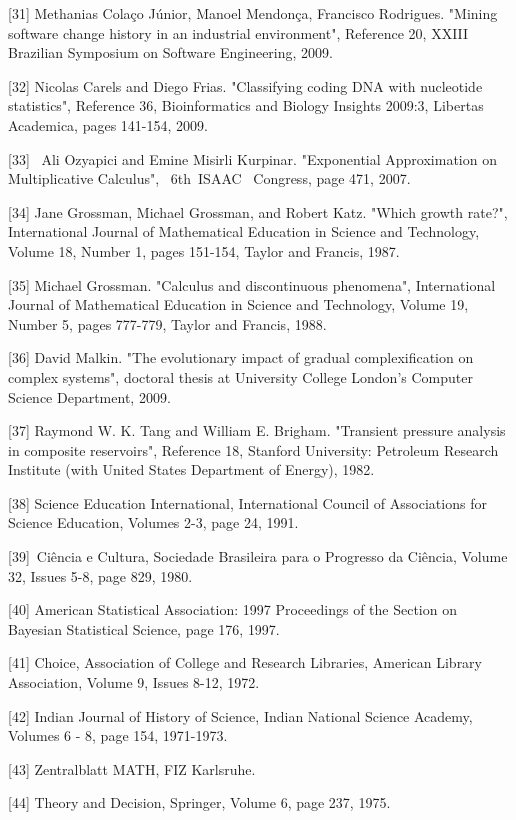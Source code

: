 \documentclass[12pt]{article}
\begin{document}
[31] Methanias Colaço Júnior, Manoel Mendonça, Francisco Rodrigues. "Mining software change history in an industrial environment", Reference 20, XXIII Brazilian Symposium on Software Engineering, 2009.

[32] Nicolas Carels and Diego Frias. "Classifying coding DNA with nucleotide statistics", Reference 36, Bioinformatics and Biology Insights 2009:3, Libertas Academica, pages 141-154, 2009.

[33]  Ali Ozyapici and Emine Misirli Kurpinar. "Exponential Approximation on Multiplicative Calculus",  6th ISAAC  Congress, page 471, 2007.

[34] Jane Grossman, Michael Grossman, and Robert Katz. "Which growth rate?", International Journal of Mathematical Education in Science and Technology, Volume 18, Number 1, pages 151-154, Taylor and Francis, 1987.

[35] Michael Grossman. "Calculus and discontinuous phenomena", International Journal of Mathematical Education in Science and Technology, Volume 19, Number 5, pages 777-779, Taylor and Francis, 1988.

[36] David Malkin. "The evolutionary impact of gradual complexification on complex systems", doctoral thesis at University College London's Computer Science Department, 2009.

[37] Raymond W. K. Tang and William E. Brigham. "Transient pressure analysis in composite reservoirs", Reference 18, Stanford University: Petroleum Research Institute (with United States Department of Energy), 1982.

[38] Science Education International, International Council of Associations for Science Education, Volumes 2-3, page 24, 1991.

[39] Ciência e Cultura, Sociedade Brasileira para o Progresso da Ciência, Volume 32, Issues 5-8, page 829, 1980.

[40] American Statistical Association: 1997 Proceedings of the Section on Bayesian Statistical Science, page 176, 1997.

[41] Choice, Association of College and Research Libraries, American Library Association, Volume 9, Issues 8-12, 1972.

[42] Indian Journal of History of Science, Indian National Science Academy, Volumes 6 - 8, page 154, 1971-1973.

[43] Zentralblatt MATH, FIZ Karlsruhe.

[44] Theory and Decision, Springer, Volume 6, page 237, 1975.
\end{document}
